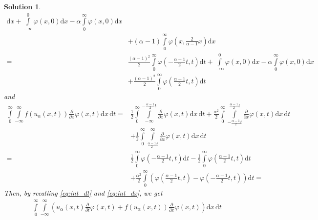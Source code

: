 \documentclass[10pt,letterpaper]{article}
\theoremstyle{break}
\newtheorem{mysolution}{Solution}
\newenvironment{solution}{\begin{mysolution}}{\end{mysolution}}
\begin{document}
\begin{solution}
\begin{equation}
\begin{aligned}
    	\text{d}x
    	+
    	\int\limits_{-\infty}^{0}
    	\varphi
    	\left(x,0\right)
    	\text{d}x
    	-\alpha
    	\int\limits_{0}^{\infty}
    	\varphi
    	\left(x,0\right)
    	\text{d}x \\
    	&
    	+
    	(\alpha-1)
    	\int\limits_{0}^{\infty}
    	\varphi
    	\left(x,\frac{2}{\alpha-1}x\right)
    	\text{d}x
    	\\
    	=
    	&
    	\frac{(\alpha-1)^2}{2}
    	\int\limits_{0}^{\infty}
    	\varphi
    	\left(-\frac{\alpha-1}{2}t,t\right)
    	\text{d}t
    	+
    	\int\limits_{-\infty}^{0}
    	\varphi
    	\left(x,0\right)
    	\text{d}x
    	-\alpha
    	\int\limits_{0}^{\infty}
    	\varphi
    	\left(x,0\right)
    	\text{d}x \\
    	&
    	+
    	\frac{(\alpha-1)^2}{2}
    	\int\limits_{0}^{\infty}
    	\varphi
    	\left(\frac{\alpha-1}{2}t,t\right)
    	\text{d}t
    \end{aligned}
    \end{equation}
    and
    \begin{equation}\label{eq:int_dx}
    \begin{aligned}
    	\int\limits_{0}^{\infty}
    	\int\limits_{-\infty}^{\infty}
    	f(u_\alpha(x,t))
    	\frac{\partial}{\partial x} \varphi(x,t)
    	\text{d}x\, \text{d}t
    	=
    	&
    	\frac{1}{2}
    	\int\limits_{0}^{\infty}
    	\int\limits_{-\infty}^{-\frac{\alpha-1}{2}t}
    	\frac{\partial}{\partial x} \varphi(x,t)
    	\text{d}x\, \text{d}t
    	+
    	\frac{\alpha^2}{2}
    	\int\limits_{0}^{\infty}
    	\int\limits_{-\frac{\alpha-1}{2}t}^{\frac{\alpha-1}{2}t}
    	\frac{\partial}{\partial x} \varphi(x,t)
    	\text{d}x\, \text{d}t \\
    	&
    	+
    	\frac{1}{2}
    	\int\limits_{0}^{\infty}
    	\int\limits_{\frac{\alpha-1}{2}t}^{\infty}
    	\frac{\partial}{\partial x} \varphi(x,t)
    	\text{d}x\, \text{d}t \\
    	=
    	&
    	\frac{1}{2}
    	\int\limits_{0}^{\infty}
    	\varphi
    	\left(
    		-\frac{\alpha-1}{2}t,t
    	\right)
    	\text{d}t
    	-
    	\frac{1}{2}
    	\int\limits_{0}^{\infty}
    	\varphi
    		\left(
    			\frac{\alpha-1}{2}t,t
    		\right)
    	\text{d}t \\
    	&
    	+
    	\frac{\alpha^2}{2}
    	\int\limits_{0}^{\infty}
    	\left(
    		\varphi
    		\left(
    			\frac{\alpha-1}{2}t,t
    		\right)
    		-
    		\varphi
    		\left(
    			-\frac{\alpha-1}{2}t,t
    		\right)
    	\right)
    	\text{d}t
    	=
    \end{aligned}
    \end{equation}
    Then, by recalling \eqref{eq:int_dt} and \eqref{eq:int_dx}, we get
    \begin{align}
    	\int\limits_{0}^{\infty}
    	\int\limits_{-\infty}^{\infty}
    	\left(
    		u_\alpha(x,t)
    		\frac{\partial}{\partial t} \varphi(x,t)
    		+
    		f(u_\alpha(x,t))
    		\frac{\partial}{\partial x} \varphi(x,t)
    	\right)
    	\text{d}x\, \text{d}t
    \end{align}
\end{solution}
\end{document}
